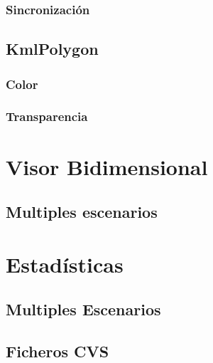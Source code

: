 \subsubsection*{Sincronización}
\subsection*{KmlPolygon}
\subsubsection*{Color}
\subsubsection*{Transparencia}
\section*{Visor Bidimensional}
\subsection*{Multiples escenarios}
\section*{Estadísticas}
\subsection*{Multiples Escenarios}
\subsection*{Ficheros CVS}
